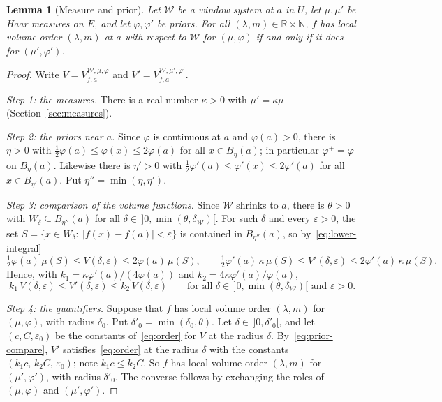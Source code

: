\documentclass[11pt,a4paper]{article}
\newtheorem{lemma}[theorem]{Lemma}
\theoremstyle{definition}
\theoremstyle{remark}
\numberwithin{equation}{section}
\newcommand{\N}{\mathbb{N}}
\newcommand{\R}{\mathbb{R}}
\newcommand{\abs}[1]{\lvert #1\rvert}
\newcommand{\eps}{\varepsilon}
\begin{document}
\begin{lemma}[Measure and prior]\label{lem:prior}
Let $\mathcal W$ be a window system at $a$ in $U$, let $\mu,\mu'$ be Haar measures on $E$, and let $\varphi,\varphi'$ be priors. For all $(\lambda,m)\in\R\times\N$, $f$ has local volume order $(\lambda,m)$ at $a$ with respect to $\mathcal W$ for $(\mu,\varphi)$ if and only if it does for $(\mu',\varphi')$.
\end{lemma}
\begin{proof}
Write $V=V^{\mathcal W,\mu,\varphi}_{f,a}$ and $V'=V^{\mathcal W,\mu',\varphi'}_{f,a}$.

\emph{Step 1: the measures.} There is a real number $\kappa>0$ with $\mu'=\kappa\mu$ (Section~\ref{sec:measures}).

\emph{Step 2: the priors near $a$.} Since $\varphi$ is continuous at $a$ and $\varphi(a)>0$, there is $\eta>0$ with $\frac12\varphi(a)\le\varphi(x)\le2\varphi(a)$ for all $x\in B_\eta(a)$; in particular $\varphi^+=\varphi$ on $B_\eta(a)$. Likewise there is $\eta'>0$ with $\frac12\varphi'(a)\le\varphi'(x)\le2\varphi'(a)$ for all $x\in B_{\eta'}(a)$. Put $\eta''=\min(\eta,\eta')$.

\emph{Step 3: comparison of the volume functions.} Since $\mathcal W$ shrinks to $a$, there is $\theta>0$ with $W_\delta\subseteq B_{\eta''}(a)$ for all $\delta\in\,]0,\min(\theta,\delta_{\mathcal W})[$. For such $\delta$ and every $\eps>0$, the set $S=\{x\in W_\delta:\ \abs{f(x)-f(a)}<\eps\}$ is contained in $B_{\eta''}(a)$, so by~\eqref{eq:lower-integral}
\[
\tfrac12\varphi(a)\,\mu(S)\le V(\delta,\eps)\le2\varphi(a)\,\mu(S),\qquad\tfrac12\varphi'(a)\,\kappa\,\mu(S)\le V'(\delta,\eps)\le2\varphi'(a)\,\kappa\,\mu(S).
\]
Hence, with $k_1=\kappa\varphi'(a)/(4\varphi(a))$ and $k_2=4\kappa\varphi'(a)/\varphi(a)$,
\begin{equation}\label{eq:prior-compare}
k_1\,V(\delta,\eps)\le V'(\delta,\eps)\le k_2\,V(\delta,\eps)\qquad\text{for all }\delta\in\,]0,\min(\theta,\delta_{\mathcal W})[\text{ and }\eps>0 .
\end{equation}

\emph{Step 4: the quantifiers.} Suppose that $f$ has local volume order $(\lambda,m)$ for $(\mu,\varphi)$, with radius $\delta_0$. Put $\delta'_0=\min(\delta_0,\theta)$. Let $\delta\in\,]0,\delta'_0[$, and let $(c,C,\eps_0)$ be the constants of~\eqref{eq:order} for $V$ at the radius $\delta$. By~\eqref{eq:prior-compare}, $V'$ satisfies~\eqref{eq:order} at the radius $\delta$ with the constants $(k_1c,\,k_2C,\,\eps_0)$; note $k_1c\le k_2C$. So $f$ has local volume order $(\lambda,m)$ for $(\mu',\varphi')$, with radius $\delta'_0$. The converse follows by exchanging the roles of $(\mu,\varphi)$ and $(\mu',\varphi')$.
\end{proof}
\end{document}
